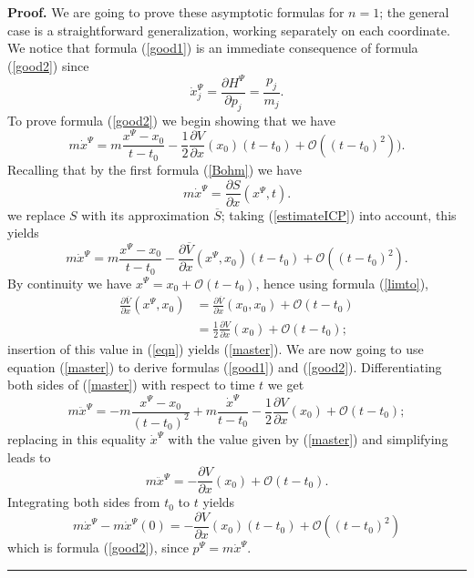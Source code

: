 \documentclass[12pt]{article}%
\newenvironment{proof}[1][Proof]{\noindent\textbf{#1.} }{\ \rule{0.5em}{0.5em}}
\begin{document}
\begin{proof}
We are going to prove these asymptotic formulas for $n=1$; the general case is
a straightforward generalization, working separately on each coordinate. We
notice that formula (\ref{good1}) is an immediate consequence of formula
(\ref{good2}) since
\[
\dot{x}_{j}^{\Psi}=\frac{\partial H^{\Psi}}{\partial p_{j}}=\frac{p_{j}}%
{m_{j}}.
\]
To prove formula (\ref{good2}) we begin showing that we have
\begin{equation}
m\dot{x}^{\Psi}=m\frac{x^{\Psi}-x_{0}}{t-t_{0}}-\frac{1}{2}\frac{\partial
V}{\partial x}(x_{0})(t-t_{0})+\mathcal{O}((t-t_{0})^{2})). \label{master}%
\end{equation}
Recalling that by the first formula (\ref{Bohm}) we have%
\begin{equation}
m\dot{x}^{\Psi}=\frac{\partial S}{\partial x}(x^{\Psi},t). \label{Bohmbis}%
\end{equation}
we replace $S$ with its approximation $\overline{S}$; taking
(\ref{estimateICP}) into account, this yields
\begin{equation}
m\dot{x}^{\Psi}=m\frac{x^{\Psi}-x_{0}}{t-t_{0}}-\frac{\partial\overline{V}%
}{\partial x}(x^{\Psi},x_{0})(t-t_{0})+\mathcal{O}((t-t_{0})^{2}). \label{eqn}%
\end{equation}
By continuity we have $x^{\Psi}=x_{0}+\mathcal{O}(t-t_{0})$, hence using
formula (\ref{limto}),
\begin{align*}
\frac{\partial\overline{V}}{\partial x}(x^{\Psi},x_{0})  &  =\frac
{\partial\overline{V}}{\partial x}(x_{0},x_{0})+\mathcal{O}(t-t_{0})\\
&  =\frac{1}{2}\frac{\partial V}{\partial x}(x_{0})+\mathcal{O}(t-t_{0});
\end{align*}
insertion of this value in (\ref{eqn}) yields (\ref{master}). We are now going
to use equation (\ref{master}) to derive formulas (\ref{good1}) and
(\ref{good2}). Differentiating both sides of (\ref{master}) with respect to
time $t$ we get%
\[
m\ddot{x}^{\Psi}=-m\frac{x^{\Psi}-x_{0}}{(t-t_{0})^{2}}+m\frac{\dot{x}^{\Psi}%
}{t-t_{0}}-\frac{1}{2}\frac{\partial V}{\partial x}(x_{0})+\mathcal{O}%
(t-t_{0});
\]
replacing in this equality $\dot{x}^{\Psi}$ with the value given by
(\ref{master}) and simplifying leads to%
\[
m\ddot{x}^{\Psi}=-\frac{\partial V}{\partial x}(x_{0})+\mathcal{O}(t-t_{0}).
\]
Integrating both sides from $t_{0}$ to $t$ yields%
\[
m\dot{x}^{\Psi}-m\dot{x}^{\Psi}(0)=-\frac{\partial V}{\partial x}%
(x_{0})(t-t_{0})+\mathcal{O}((t-t_{0})^{2})
\]
which is formula (\ref{good2}), since $p^{\Psi}=m\dot{x}^{\Psi}$.
\end{proof}
\end{document}
